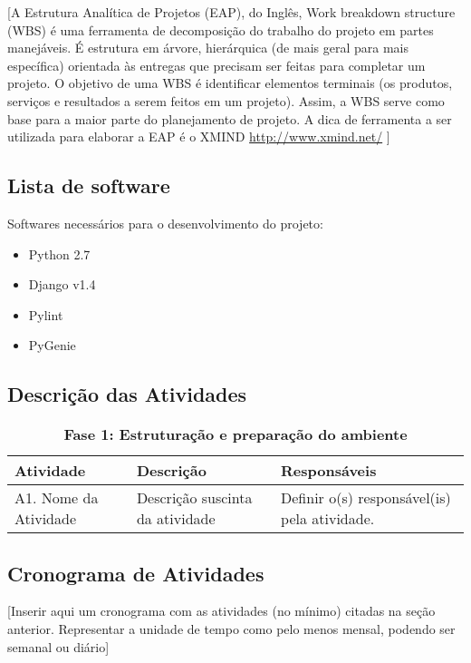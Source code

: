 [A Estrutura Analítica de Projetos (EAP), do Inglês, Work breakdown structure (WBS) é uma ferramenta de decomposição do trabalho do projeto em partes manejáveis. É estrutura em árvore, hierárquica (de mais geral para mais específica) orientada às entregas que precisam ser feitas para completar um projeto.
O objetivo de uma WBS é identificar elementos terminais (os produtos, serviços e resultados a serem feitos em um projeto). Assim, a WBS serve como base para a maior parte do planejamento de projeto.
A dica de ferramenta a ser utilizada para elaborar a EAP é o XMIND 
\url{http://www.xmind.net/} ]


\subsection{Lista de software} %
\label{sub:lista_de_software}

Softwares necessários para o desenvolvimento do projeto:
\begin{itemize}
	\item Python 2.7
	\item Django v1.4
	\item Pylint
	\item PyGenie
\end{itemize}


\subsection{Descrição das Atividades} %
\label{sub:descri_o_das_atividades}

\begin{table}[htbp]
\centering
\caption{\textbf{Fase 1: Estruturação e preparação do ambiente}}
\begin{tabular}{|p{2.5cm}|p{10cm}|p{2.5cm}|}
\hline
\textbf{Atividade} & \textbf{Descrição} & \textbf{Responsáveis} \\ \hline
A1. Nome da Atividade & Descrição suscinta da atividade & Definir o(s) responsável(is) pela atividade. \\ \hline
\end{tabular}
\label{}
\end{table}


\subsection{Cronograma de Atividades} %
\label{sub:cronograma_de_atividades}

[Inserir aqui um cronograma com as atividades (no mínimo) citadas na seção anterior. Representar a unidade de tempo como pelo menos mensal, podendo ser semanal ou diário]
